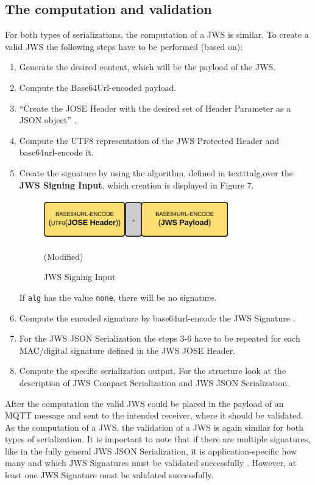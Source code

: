 \subsection{The computation and validation }
For both types of serializations, the computation of a JWS is similar. To create a valid JWS the following steps have to be performed (based on\cite{rfc7515}): 
\begin{enumerate} [leftmargin=1cm,rightmargin=1cm]\itemsep0.2em
\item Generate the desired content, which will be the payload of the JWS.
\item Compute the Base64Url-encoded payload. 
\item ``Create the JOSE Header with the desired set of Header Parameter as a JSON object'' \cite{rfc7515}.
\item Compute the UTF8 representation of the JWS Protected Header and base64url-encode it.
\item Create the signature by using the algorithm, defined in texttt{alg},\newline over the \textbf{JWS Signing Input}, which creation is displayed in Figure 7. 
\begin{figure}
\centering
\includegraphics[width=8cm]{Pages/JWS/SigningInput.png}
\caption{JWS Signing Input}\cite{Compact} (Modified)
\end{figure} If \texttt{alg} has the value \texttt{none}, there will be no signature.
\item Compute the encoded signature by base64url-encode the JWS Signature .
\item For the JWS JSON Serialization the steps 3-6 have to be repeated for each MAC/digital signature defined in the JWS JOSE Header.
\item Compute the specific serialization output. For the structure look at the description of JWS Compact Serialization and JWS JSON Serialization.
\end{enumerate} 
After the computation the valid JWS could be placed in the payload of an MQTT message and sent to the intended receiver, where it should be validated.
As the computation of a JWS, the validation of a JWS is again similar for both types of serialization. It is important to note that if there are multiple signatures, like in the fully general JWS JSON Serialization,  it is application-specific how many and which JWS Signatures must be validated successfully \cite{rfc7515}. However, at least one JWS Signature must be validated successfully.
